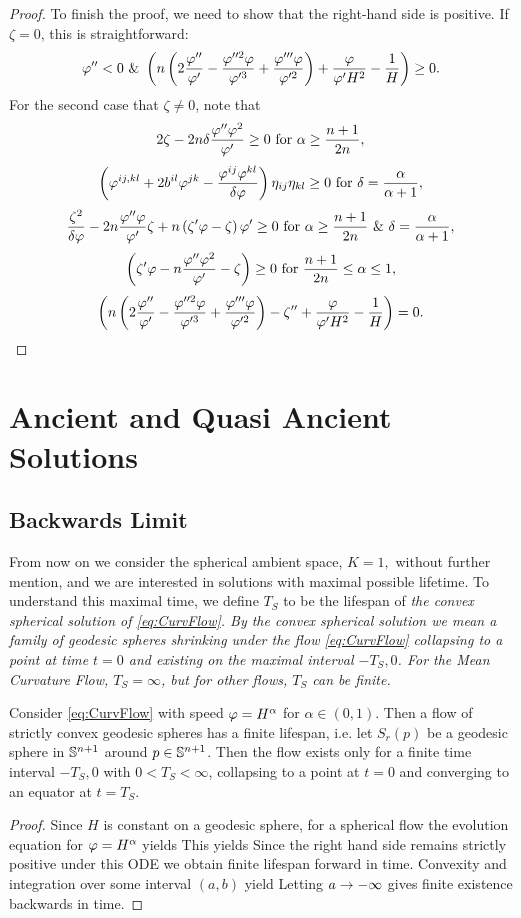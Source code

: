 \documentclass{amsart}
\begin{document}
\begin{proof}
To finish the proof, we need to show that the right-hand side is positive. If $\zeta=0$, this is straightforward:
\[\varphi''<0~\&~\br{n\br{2\fr{\p''}{\p'}-\fr{\p''^{2}\p}{\p'^{3}}+\fr{\p'''\p}{\p'^{2}}}+\fr{\p}{\p'H^2}-\fr{1}{H}}\geq 0.\]
For the second case that $\zeta\neq 0$, note that
$$2\zeta-2n\d\fr{\p''\p^2}{\p'}\geq 0~\mbox{for}~\alpha\geq \frac{n+1}{2n},$$
$$\br{\p^{ij,kl}+2b^{il}\p^{jk}-\fr{\p^{ij}\p^{kl}}{\d\p}}\eta_{ij}\eta_{kl}\geq0~\mbox{for}~\delta=\frac{\alpha}{\alpha+1},$$
$$\fr{\zeta^2}{\d\p}-2n\fr{\p''\p}{\p'}\zeta+n\br{\zeta'\p-\zeta}\p'\geq 0~\mbox{for}~\alpha\geq\frac{n+1}{2n}~\&~\delta=\frac{\alpha}{\alpha+1},$$
$$\br{\zeta'\p-n\fr{\p''\p^2}{\p'}-\zeta}\geq 0~\mbox{for}~\frac{n+1}{2n}\leq \alpha\leq 1,$$
$$\br{n\br{2\fr{\p''}{\p'}-\fr{\p''^{2}\p}{\p'^{3}}+\fr{\p'''\p}{\p'^{2}}}-\zeta''+\fr{\p}{\p'H^2}-\fr{1}{H}}=0.$$
\end{proof}

\section{Ancient and Quasi Ancient Solutions}

\subsection{Backwards Limit}

From now on we consider the spherical ambient space, $K=1,$ without further mention, and we are interested in solutions with maximal possible lifetime. To understand this maximal time, we define $T_S$ to be the lifespan of \it{the} convex spherical solution of \eqref{eq:CurvFlow}. By the convex spherical solution we mean a family of geodesic spheres shrinking under the flow \eqref{eq:CurvFlow} collapsing to a point at time $t=0$ and existing on the maximal interval \(-T_S, 0\). For the Mean Curvature Flow, \(T_S = \infty\), but for other flows, \(T_S\) can be finite.

\begin{lemma}
 Consider \eqref{eq:CurvFlow} with speed \(\p = H^{\alpha}\) for \(\alpha \in (0,1)\). Then a flow of strictly convex geodesic spheres has a finite lifespan, i.e. let $S_r(p)$ be a geodesic sphere in $\S^{n+1}$ around $p\in \S^{n+1}$. Then the flow exists only for a finite time interval \(-T_S,0\) with \(0 < T_S < \infty\), collapsing to a point at \(t=0\) and converging to an equator at \(t=T_S\).
\end{lemma}

\begin{proof}
Since $H$ is constant on a geodesic sphere, for a spherical flow the evolution equation for $\p=H^{\a}$ yields
This yields
Since the right hand side remains strictly positive under this ODE we obtain finite lifespan forward in time.
Convexity and integration over some interval $(a,b)$ yield
Letting $a\ra-\8$ gives finite existence backwards in time.
\end{proof}
\end{document}
